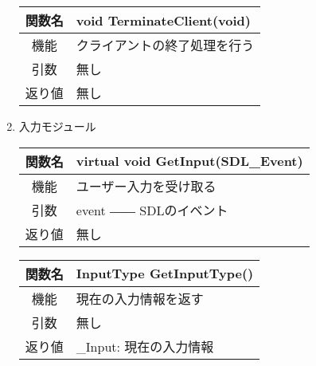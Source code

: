 \documentclass{jarticle}
\begin{document}
\begin{enumerate}
    \begin{table}[H]
        \label{table:fanc_c1-5}
        \begin{center}
            \begin{tabular}{|c||p{30em}|}\hline
                関数名&void TerminateClient(void)  \\\hline
                機能&クライアントの終了処理を行う\\
                引数&無し\\
                返り値&無し\\\hline
            \end{tabular}
        \end{center}
    \end{table}
    

    \item 入力モジュール
    \begin{table}[H]
        \label{table:fanc_c2-1}
        \begin{center}
            \begin{tabular}{|c||p{30em}|}\hline
                関数名&virtual void GetInput(SDL\_Event)\\\hline
                機能&ユーザー入力を受け取る\\
                引数&event ―― SDLのイベント\\
                返り値&無し\\\hline
            \end{tabular}
        \end{center}
    \end{table}
    \begin{table}[H]
        \label{table:fanc_c2-2}
        \begin{center}
            \begin{tabular}{|c||p{30em}|}\hline
                関数名&InputType GetInputType()\\\hline
                機能&現在の入力情報を返す\\
                引数&無し\\
                返り値&\_Input: 現在の入力情報\\\hline
            \end{tabular}
        \end{center}
    \end{table}
    
\end{enumerate}
\end{document}
